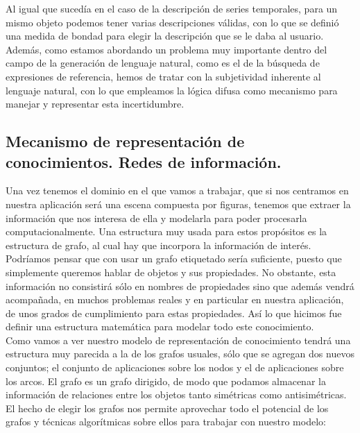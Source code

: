 \documentclass[10pt,a4paper]{article}
\begin{document}
Al igual que sucedía en el caso de la descripción de series temporales, para un mismo objeto podemos tener varias descripciones válidas, con lo que se definió una medida de bondad para elegir la descripción que se le daba al usuario. Además, como estamos abordando un problema muy importante dentro del campo de la generación de lenguaje natural, como es el de la búsqueda de expresiones de referencia, hemos de tratar con la subjetividad inherente al lenguaje natural, con lo que empleamos la lógica difusa como mecanismo para manejar y representar esta incertidumbre.

\subsection{Mecanismo de representación de conocimientos. Redes de información.}

Una vez tenemos el dominio en el que vamos a trabajar, que si nos centramos en nuestra aplicación será una escena compuesta por figuras, tenemos que extraer la información que nos interesa de ella y modelarla para poder procesarla computacionalmente. Una estructura muy usada para estos propósitos es la estructura de grafo, al cual hay que incorpora la información de interés. Podríamos pensar que con usar un grafo etiquetado sería suficiente, puesto que simplemente queremos hablar de objetos y sus propiedades. No obstante, esta información no consistirá sólo en nombres de propiedades sino que además vendrá acompañada, en muchos problemas reales y en particular en nuestra aplicación, de unos grados de cumplimiento para estas propiedades. Así lo que hicimos fue definir una estructura matemática para modelar todo este conocimiento.\\

Como vamos a ver nuestro modelo de representación de conocimiento tendrá una estructura muy parecida a la de los grafos usuales, sólo que se agregan dos nuevos conjuntos; el conjunto de aplicaciones sobre los nodos y el de aplicaciones sobre los arcos. El grafo es un grafo dirigido, de modo que podamos almacenar la información de relaciones entre los objetos tanto simétricas como antisimétricas. El hecho de elegir los grafos nos permite aprovechar todo el potencial de los grafos y técnicas algorítmicas sobre ellos para trabajar con nuestro modelo:\\
\end{document}
